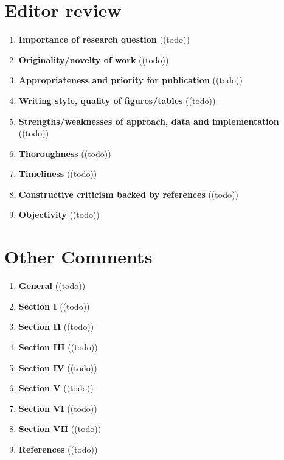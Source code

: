 \section{Editor review}\label{sec:editorreview}
\begin{enumerate}[resume]
    \item \textbf{Importance of research question} 	\textcolor{HighlightColor}{((todo))}
    \item \textbf{Originality/novelty of work} 	\textcolor{HighlightColor}{((todo))}
    \item \textbf{Appropriateness and priority for publication} 	\textcolor{HighlightColor}{((todo))}
    \item \textbf{Writing style, quality of figures/tables} 	\textcolor{HighlightColor}{((todo))}
    \item \textbf{Strengths/weaknesses of approach, data and implementation} 	\textcolor{HighlightColor}{((todo))}
    \item \textbf{Thoroughness} 	\textcolor{HighlightColor}{((todo))}
    \item \textbf{Timeliness} 	\textcolor{HighlightColor}{((todo))}
    \item \textbf{Constructive criticism backed by references} \textcolor{HighlightColor}{((todo))}
    \item \textbf{Objectivity} 	\textcolor{HighlightColor}{((todo))}
\end{enumerate}

\section{Other Comments}\label{sec:other}
\begin{enumerate}[resume]
    \item \textbf{General} 	\textcolor{HighlightColor}{((todo))}
    \item \textbf{Section I} 	\textcolor{HighlightColor}{((todo))}
    \item \textbf{Section II} 	\textcolor{HighlightColor}{((todo))}
    \item \textbf{Section III} 	\textcolor{HighlightColor}{((todo))}
    \item \textbf{Section IV} 	\textcolor{HighlightColor}{((todo))}
    \item \textbf{Section V} 	\textcolor{HighlightColor}{((todo))}
    \item \textbf{Section VI} 	\textcolor{HighlightColor}{((todo))}
    \item \textbf{Section VII} 	\textcolor{HighlightColor}{((todo))}
    \item \textbf{References} 	\textcolor{HighlightColor}{((todo))}
\end{enumerate}
